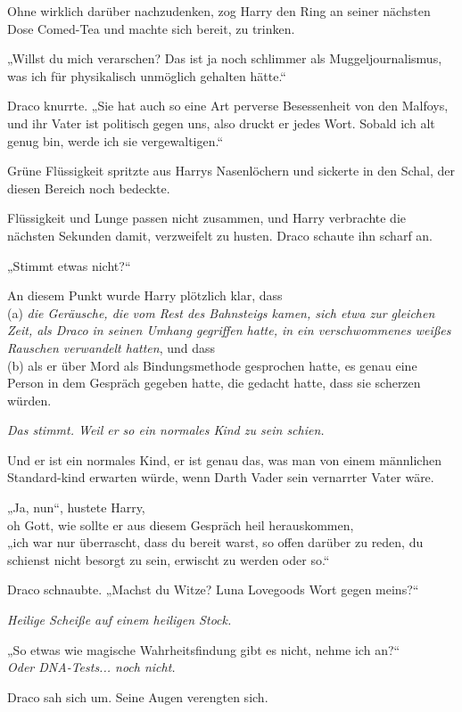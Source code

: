 {Ohne wirklich darüber nachzudenken, zog Harry den Ring an seiner nächsten Dose Comed-Tea und machte sich bereit, zu trinken.

„Willst du mich verarschen? Das ist ja noch schlimmer als Muggeljournalismus, was ich für physikalisch unmöglich gehalten hätte.“

Draco knurrte. „Sie hat auch so eine Art perverse Besessenheit von den Malfoys, und ihr Vater ist politisch gegen uns, also druckt er jedes Wort. Sobald ich alt genug bin, werde ich sie vergewaltigen.“

Grüne Flüssigkeit spritzte aus Harrys Nasenlöchern und sickerte in den Schal, der diesen Bereich noch bedeckte.

Flüssigkeit und Lunge passen nicht zusammen, und Harry verbrachte die nächsten Sekunden damit, verzweifelt zu husten. Draco schaute ihn scharf an.

„Stimmt etwas nicht?“

An diesem Punkt wurde Harry plötzlich klar, dass\\ (a) \emph{die Geräusche, die vom Rest des Bahnsteigs kamen, sich etwa zur gleichen Zeit, als Draco in seinen Umhang gegriffen hatte, in ein verschwommenes weißes Rauschen verwandelt hatten}, und dass\\ (b) als er über Mord als Bindungsmethode gesprochen hatte, es genau eine Person in dem Gespräch gegeben hatte, die gedacht hatte, dass sie scherzen würden.

\emph{Das stimmt. Weil er so ein normales Kind zu sein schien.}

Und er ist ein normales Kind, er ist genau das, was man von einem männlichen Standard-kind erwarten würde, wenn Darth Vader sein vernarrter Vater wäre.

„Ja, nun“, hustete Harry,\\ oh Gott, wie sollte er aus diesem Gespräch heil herauskommen,\\ „ich war nur überrascht, dass du bereit warst, so offen darüber zu reden, du schienst nicht besorgt zu sein, erwischt zu werden oder so.“

Draco schnaubte. „Machst du Witze? Luna Lovegoods Wort gegen meins?“

\emph{Heilige Scheiße auf einem heiligen Stock.}

„So etwas wie magische Wahrheitsfindung gibt es nicht, nehme ich an?“\\ \emph{Oder DNA-Tests... noch nicht.}

Draco sah sich um. Seine Augen verengten sich.

}
